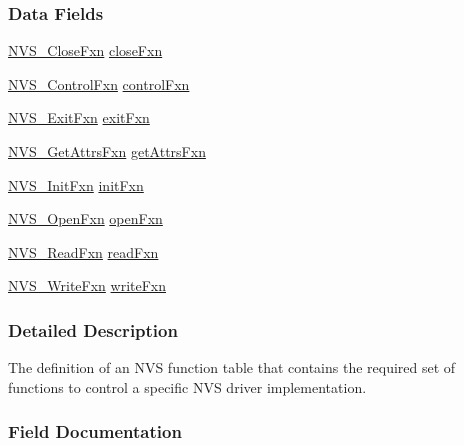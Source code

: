 \subsubsection*{Data Fields}
\begin{DoxyCompactItemize}
\item 
\hyperlink{_n_v_s_8h_a82f2a5311bf6dc69d62046fe20c3e108}{N\+V\+S\+\_\+\+Close\+Fxn} \hyperlink{struct_n_v_s___fxn_table_ad52c763811aad3bb099f2c92c794d26d}{close\+Fxn}
\item 
\hyperlink{_n_v_s_8h_a893a6b6ea0d408e348267109f3aa2736}{N\+V\+S\+\_\+\+Control\+Fxn} \hyperlink{struct_n_v_s___fxn_table_a1a5e20488f0b701ea0980bd17228022c}{control\+Fxn}
\item 
\hyperlink{_n_v_s_8h_ab15ab786e165ed50b8c2e7f6bf9e3173}{N\+V\+S\+\_\+\+Exit\+Fxn} \hyperlink{struct_n_v_s___fxn_table_a1e379c6e900a4ee6e8ded6663422d807}{exit\+Fxn}
\item 
\hyperlink{_n_v_s_8h_a6f07b7dcd80b867b79f84152c449f059}{N\+V\+S\+\_\+\+Get\+Attrs\+Fxn} \hyperlink{struct_n_v_s___fxn_table_a7d1f0f2c1dd51aa90cecccd178638531}{get\+Attrs\+Fxn}
\item 
\hyperlink{_n_v_s_8h_ad2e24ef1cb8bad08b75bc36c6a9cc36d}{N\+V\+S\+\_\+\+Init\+Fxn} \hyperlink{struct_n_v_s___fxn_table_a8e59ff1f3109c7b04194f176df155555}{init\+Fxn}
\item 
\hyperlink{_n_v_s_8h_ad4be882e6ffecd7d54c3daa02a41752b}{N\+V\+S\+\_\+\+Open\+Fxn} \hyperlink{struct_n_v_s___fxn_table_a41667ec87600c340a861475f916feb1b}{open\+Fxn}
\item 
\hyperlink{_n_v_s_8h_ac5f94f84441e53eecbb1e3e6af41f019}{N\+V\+S\+\_\+\+Read\+Fxn} \hyperlink{struct_n_v_s___fxn_table_a33828cc4c1c845e5a7f95440e79a4e94}{read\+Fxn}
\item 
\hyperlink{_n_v_s_8h_ad512db474e5833af4330fb57095c7fca}{N\+V\+S\+\_\+\+Write\+Fxn} \hyperlink{struct_n_v_s___fxn_table_a67cbdb1f87bf99c91079da45aa0150a3}{write\+Fxn}
\end{DoxyCompactItemize}


\subsubsection{Detailed Description}
The definition of an N\+V\+S function table that contains the required set of functions to control a specific N\+V\+S driver implementation. 

\subsubsection{Field Documentation}
